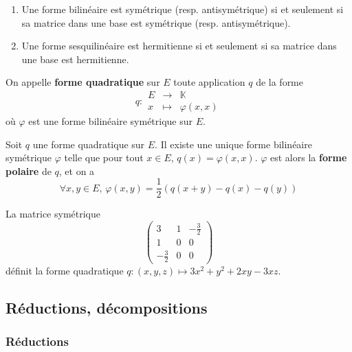   \begin{proposition}
    \begin{enumerate}[label={\bfseries(\roman*)}]
      \item Une forme bilinéaire est symétrique (resp. antisymétrique) si et seulement si sa matrice dans une base est symétrique (resp. antisymétrique).
      \item Une forme sesquilinéaire est hermitienne si et seulement si sa matrice dans une base est hermitienne.
    \end{enumerate}
  \end{proposition}

  \begin{definition}
    On appelle \textbf{forme quadratique} sur $E$ toute application $q$ de la forme
    \[
    q :
    \begin{array}{ccc}
      E &\rightarrow& \mathbb{K} \\
      x &\mapsto& \varphi(x, x)
    \end{array}
    \]
    où $\varphi$ est une forme bilinéaire symétrique sur $E$.
  \end{definition}

  \begin{proposition}
    Soit $q$ une forme quadratique sur $E$. Il existe une unique forme bilinéaire symétrique $\varphi$ telle que pour tout $x \in E$, $q(x)=\varphi(x,x)$.
    \newpar
    $\varphi$ est alors la \textbf{forme polaire} de $q$, et on a
    \[ \forall x, y \in E, \, \varphi(x,y) = \frac{1}{2} (q(x+y) - q(x) - q(y)) \]
  \end{proposition}

  \begin{example}
    La matrice symétrique
    \[
      \begin{pmatrix}
        3 & 1 & -\frac{3}{2} \\
        1 & 0 & 0 \\
        -\frac{3}{2} & 0 & 0
      \end{pmatrix}
    \]
    définit la forme quadratique $q : (x, y, z) \mapsto 3x^2 + y^2 + 2xy - 3xz$.
  \end{example}

  \subsection{Réductions, décompositions}

  \subsubsection{Réductions}

